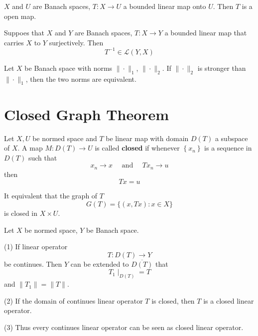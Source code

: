 \documentclass[12pt, oneside]{book}
\begin{document}
\begin{corollary}
    $X$ and $U$ are Banach spaces, $T: X \rightarrow U$ a bounded linear map onto $U$. Then $T$ is a open map.
\end{corollary}
\begin{corollary}
    Suppoes that $X$ and $Y$ are Banach spaces, $T: X \rightarrow Y$ a bounded linear map that carries $X$ to $Y$ surjectively. Then
    \begin{equation*}
        T^{-1} \in \mathcal{L}(Y,X)
    \end{equation*}
\end{corollary}

\begin{corollary}
    Let $X$ be Banach space with norms $\|\cdot\|_1$, $\|\cdot\|_2$. If $\|\cdot\|_2$ is stronger than $\|\cdot\|_1$, then the two norms are equivalent.

\end{corollary}

\section{Closed Graph Theorem}

\begin{definition}
    Let $X,U$ be normed space and $T$ be linear map with domain $D\left(T\right)$ a subspace of $X$.
    A map $M:D(T)\rightarrow U$ is called \textbf{closed} if whenever $\left\{x_n\right\}$ is a sequence in $D(T)$ such that
    \begin{equation*}
        x_n \longrightarrow x \quad \text { and } \quad T x_n \rightarrow u
    \end{equation*}
    then
    \begin{equation*}
        T x=u
    \end{equation*}

    It equivalent that the graph of $T$
    \begin{equation*}
        G(T)
        =
        \{(x,Tx):x\in X\}
    \end{equation*}
    is closed in $X\times U$.
\end{definition}


\begin{proposition}
    Let $X$ be normed space,
    $Y$ be Banach space.

    (1) If linear operator
    \begin{equation*}
        T: D(T)\rightarrow Y
    \end{equation*}
    be continues. Then $Y$ can be extended to $\overline{D(T)}$ that
    \begin{equation*}
        T_1\mid_{D(T)} =T
    \end{equation*}
    and $\|T_1\| =\|T\|$.

    (2) If the domain of continues linear operator $T$ is closed, then $T$ is a closed linear operator.

    (3) Thus every continues linear operator can be seen as closed linear operator.
\end{proposition}
\end{document}
